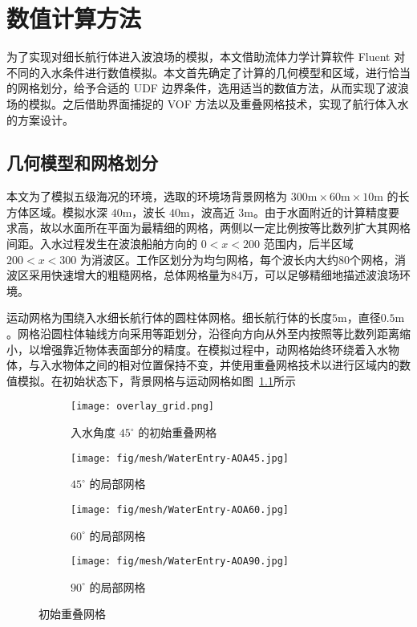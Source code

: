\chapter{数值计算方法}
为了实现对细长航行体进入波浪场的模拟，本文借助流体力学计算软件 Fluent 对不同的入水条件进行数值模拟。本文首先确定了计算的几何模型和区域，进行恰当的网格划分，给予合适的 UDF 边界条件，选用适当的数值方法，从而实现了波浪场的模拟。之后借助界面捕捉的 VOF 方法以及重叠网格技术，实现了航行体入水的方案设计。
\section{几何模型和网格划分}
本文为了模拟五级海况\cite{Xia1987}的环境，选取的环境场背景网格为 $300 \mathrm m \times 60 \mathrm m \times 10 \mathrm m$ 的长方体区域。模拟水深 $40 \mathrm m$，波长 $40 \mathrm m$，波高近 $3 \mathrm m$。由于水面附近的计算精度要求高，故以水面所在平面为最精细的网格，两侧以一定比例按等比数列扩大其网格间距。入水过程发生在波浪船舶方向的 $0 < x < 200$ 范围内，后半区域 $200 < x < 300$ 为消波区。工作区划分为均匀网格，每个波长内大约80个网格，消波区采用快速增大的粗糙网格，总体网格量为84万，可以足够精细地描述波浪场环境。

运动网格为围绕入水细长航行体的圆柱体网格。细长航行体的长度$5 \mathrm m$，直径$0.5 \mathrm m$。网格沿圆柱体轴线方向采用等距划分，沿径向方向从外至内按照等比数列距离缩小，以增强靠近物体表面部分的精度。在模拟过程中，动网格始终环绕着入水物体，与入水物体之间的相对位置保持不变，并使用重叠网格技术以进行区域内的数值模拟。在初始状态下，背景网格与运动网格如图~\ref{fig:overlay_grid}所示

\begin{figure}[!htp]
  \begin{subfigure}{\textwidth}
    \centering
    \texttt{[image: overlay\_grid.png]}
    \caption[]{入水角度 $45 ^ \circ$ 的初始重叠网格}
  \end{subfigure}

  \quad

  \begin{subfigure}{0.3\textwidth}
    \centering
    \texttt{[image: fig/mesh/WaterEntry-AOA45.jpg]}
    \caption[]{$45 ^\circ$ 的局部网格}
  \end{subfigure}
  \hspace{0.2cm}
  \begin{subfigure}{0.3\textwidth}
    \centering
    \texttt{[image: fig/mesh/WaterEntry-AOA60.jpg]}
    \caption[]{$60 ^\circ$ 的局部网格}
  \end{subfigure}
  \hspace{0.2cm}
  \begin{subfigure}{0.3\textwidth}
    \centering
    \texttt{[image: fig/mesh/WaterEntry-AOA90.jpg]}
    \caption[]{$90 ^\circ$ 的局部网格}
  \end{subfigure}
  \caption{初始重叠网格}
  \label{fig:overlay_grid}
\end{figure}

